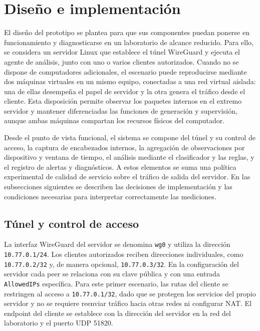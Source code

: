 \documentclass[conference]{IEEEtran}
\begin{document}
\section{Diseño e implementación}

El diseño del prototipo se plantea para que sus componentes puedan ponerse en funcionamiento y diagnosticarse en un laboratorio de alcance reducido. Para ello, se considera un servidor Linux que establece el túnel WireGuard y ejecuta el agente de análisis, junto con uno o varios clientes autorizados. Cuando no se dispone de computadores adicionales, el escenario puede reproducirse mediante dos máquinas virtuales en un mismo equipo, conectadas a una red virtual aislada: una de ellas desempeña el papel de servidor y la otra genera el tráfico desde el cliente. Esta disposición permite observar los paquetes internos en el extremo servidor y mantener diferenciadas las funciones de generación y supervisión, aunque ambas máquinas compartan los recursos físicos del computador.

Desde el punto de vista funcional, el sistema se compone del túnel y su control de acceso, la captura de encabezados internos, la agregación de observaciones por dispositivo y ventana de tiempo, el análisis mediante el clasificador y las reglas, y el registro de alertas y diagnósticos. A estos elementos se suma una política experimental de calidad de servicio sobre el tráfico de salida del servidor. En las subsecciones siguientes se describen las decisiones de implementación y las condiciones necesarias para interpretar correctamente las mediciones.

\subsection{Túnel y control de acceso}
La interfaz WireGuard del servidor se denomina \texttt{wg0} y utiliza la dirección \texttt{10.77.0.1/24}. Los clientes autorizados reciben direcciones individuales, como \texttt{10.77.0.2/32} y, de manera opcional, \texttt{10.77.0.3/32}. En la configuración del servidor cada peer se relaciona con su clave pública y con una entrada \texttt{AllowedIPs} específica. Para este primer escenario, las rutas del cliente se restringen al acceso a \texttt{10.77.0.1/32}, dado que se protegen los servicios del propio servidor y no se requiere reenviar tráfico hacia otras redes ni configurar NAT. El endpoint del cliente se establece con la dirección del servidor en la red del laboratorio y el puerto UDP 51820.
\end{document}
